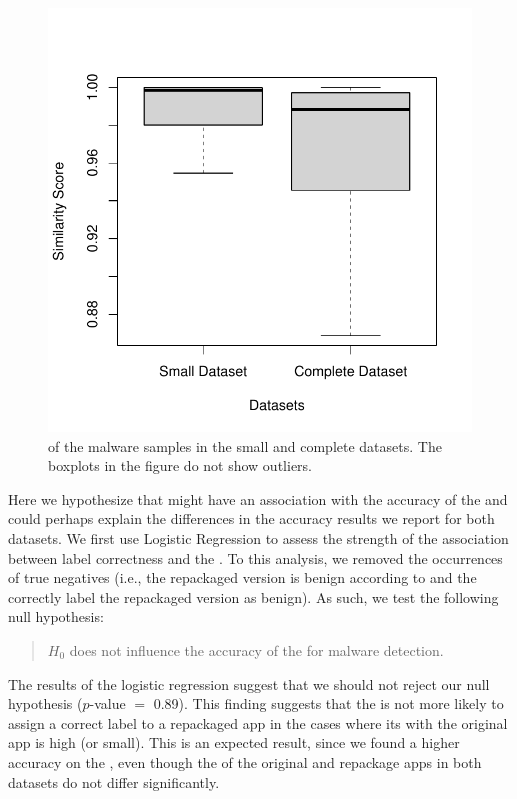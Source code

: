 \begin{figure}
  \includegraphics[width=\columnwidth]{images/boxplotSimilarity.pdf}
  \caption{\sscore of the malware samples in the small and complete datasets. The boxplots in the figure do not show
  outliers.}
  \label{fig:ss}
\end{figure}


Here we hypothesize that \sscore might have an
association with the accuracy of the \mas and could perhaps explain
the differences in the accuracy results we report for both
datasets. We first use Logistic Regression to assess the strength
of the association between label correctness and
the \sscore. To this analysis, we removed the
occurrences of true negatives (i.e., the repackaged version is benign according to
\vt and the \mas correctly label the repackaged version as benign).
As such, we test the following null hypothesis:

\begin{quote}
  {\bf $H_0$} \sscore does not influence the accuracy of the
  \mas for malware detection. 
\end{quote}

The results of the logistic regression suggest that we should
not reject our null hypothesis ($p$-value $=$ 0.89). This finding suggests
that the \mas is not more likely to assign a correct label to
a repackaged app in the cases where its \sscore with the original
app is high (or small). This is an expected result, since
we found a higher accuracy on the \sds, even though  the
\sscore of the original and repackage apps in both datasets
do not differ significantly.

